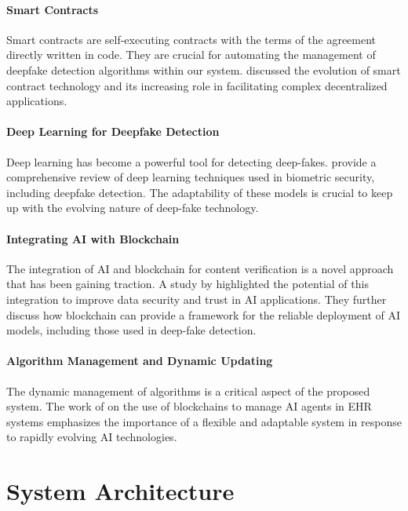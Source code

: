 \documentclass{article}
\begin{document}
\paragraph{Smart Contracts} Smart contracts are self-executing contracts with the terms of the agreement directly written in code. They are crucial for automating the management of deepfake detection algorithms within our system. \citep{Wu2022} discussed the evolution of smart contract technology and its increasing role in facilitating complex decentralized applications.

\paragraph{Deep Learning for Deepfake Detection} Deep learning has become a powerful tool for detecting deep-fakes. \citep{passos2023review} provide a comprehensive review of deep learning techniques used in biometric security, including deepfake detection. The adaptability of these models is crucial to keep up with the evolving nature of deep-fake technology.

\paragraph{Integrating AI with Blockchain} The integration of AI and blockchain for content verification is a novel approach that has been gaining traction. A study by \citep{Wang2021TheAO} highlighted the potential of this integration to improve data security and trust in AI applications. They further discuss how blockchain can provide a framework for the reliable deployment of AI models, including those used in deep-fake detection.

\paragraph{Algorithm Management and Dynamic Updating} The dynamic management of algorithms is a critical aspect of the proposed system. The work of \citep{vyas2022} on the use of blockchains to manage AI agents in EHR systems emphasizes the importance of a flexible and adaptable system in response to rapidly evolving AI technologies.

\section{System Architecture}
\end{document}
